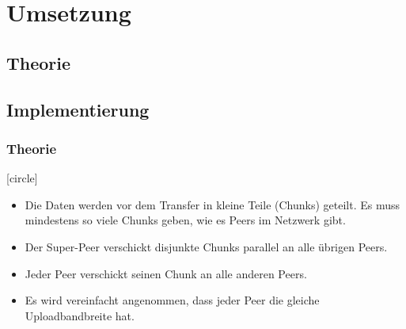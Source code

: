 
\section{Umsetzung}

\subsection{Theorie}
\subsection{Implementierung}

\begin{frame}
  \frametitle{Theorie}

  [circle]
  \begin{itemize}  
    \item Die Daten werden vor dem Transfer in kleine Teile (Chunks) geteilt. Es muss mindestens so viele Chunks geben, wie es Peers im Netzwerk gibt.

    \item Der Super-Peer verschickt disjunkte Chunks parallel an alle übrigen Peers.

    \item Jeder Peer verschickt seinen Chunk an alle anderen Peers.

    \item Es wird vereinfacht angenommen, dass jeder Peer die gleiche Uploadbandbreite hat.
  \end{itemize}	

\end{frame}




